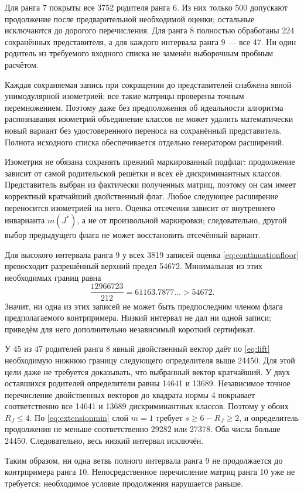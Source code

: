 \documentclass[11pt,a4paper]{article}
\theoremstyle{remark}\newtheorem{remark}[theorem]{Замечание}
\begin{document}
Для ранга 7 покрыты все 3752 родителя ранга 6. Из них только 500 допускают продолжение после предварительной необходимой оценки; остальные исключаются до дорогого перечисления. Для ранга 8 полностью обработаны 224 сохранённых представителя, а для каждого интервала ранга 9 --- все 47. Ни один родитель из требуемого входного списка не заменён выборочным пробным расчётом.

Каждая сохраняемая запись при сокращении до представителей снабжена явной унимодулярной изометрией; все такие матрицы проверены точным перемножением. Поэтому даже без предположения об идеальности алгоритма распознавания изометрий объединение классов не может удалить математически новый вариант без удостоверенного переноса на сохранённый представитель. Полнота исходного списка обеспечивается отдельно генератором расширений.

Изометрия не обязана сохранять прежний маркированный подфлаг: продолжение зависит от самой родительской решётки и всех её дискриминантных классов. Представитель выбран из фактически полученных матриц, поэтому он сам имеет корректный кратчайший двойственный флаг. Любое следующее расширение переносится изометрией на него. Оценка отсечения зависит от внутреннего инварианта $m(J^*)$, а не от произвольной маркировки; следовательно, другой выбор предыдущего флага не может восстановить отсечённый вариант.

Для высокого интервала ранга 9 у всех 3819 записей оценка \eqref{eq:continuationfloor} превосходит разрешённый верхний предел 54672. Минимальная из этих необходимых границ равна
\[
\frac{12966723}{212}=61163.7877\ldots>54672.
\]
Значит, ни одна из этих записей не может быть предпоследним членом флага предполагаемого контрпримера. Низкий интервал не дал ни одной записи; приведём для него дополнительно независимый короткий сертификат.

У 45 из 47 родителей ранга 8 явный двойственный вектор даёт по \eqref{eq:lift} необходимую нижнюю границу следующего определителя выше 24450. Для этой цели даже не требуется доказывать, что выбранный вектор кратчайший. У двух оставшихся родителей определители равны 14641 и 13689. Независимое точное перечисление двойственных векторов до квадрата нормы 4 покрывает соответственно все 14641 и 13689 дискриминантных классов. Поэтому у обоих $R_J\le4$. По \eqref{eq:extensionmin} слой $m=1$ требует $s\ge6-R_J\ge2$, и определитель продолжения не меньше соответственно 29282 или 27378. Оба числа больше 24450. Следовательно, весь низкий интервал исключён.

Таким образом, ни одна ветвь полного интервала ранга 9 не продолжается до контрпримера ранга 10. Непосредственное перечисление матриц ранга 10 уже не требуется: необходимое условие продолжения нарушается раньше.
\end{document}
